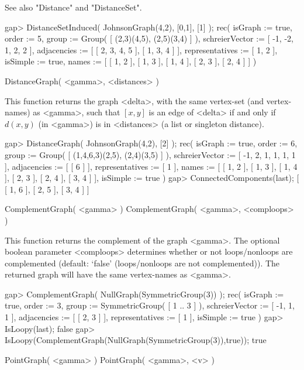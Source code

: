 See also "Distance" and "DistanceSet". 

\beginexample
gap> DistanceSetInduced( JohnsonGraph(4,2), [0,1], [1] );
rec(
  isGraph := true,
  order := 5,
  group := Group( [ (2,3)(4,5), (2,5)(3,4) ] ),
  schreierVector := [ -1, -2, 1, 2, 2 ],
  adjacencies := [ [ 2, 3, 4, 5 ], [ 1, 3, 4 ] ],
  representatives := [ 1, 2 ],
  isSimple := true,
  names := [ [ 1, 2 ], [ 1, 3 ], [ 1, 4 ], [ 2, 3 ], [ 2, 4 ] ] )
\endexample


\>DistanceGraph( <gamma>, <distances> )

This function returns the graph <delta>, with the same vertex-set
(and vertex-names) as <gamma>, such that $[x,y]$ is an edge of <delta>
if and only if $d(x,y)$ (in <gamma>) is in <distances> (a list or
singleton distance).

\beginexample
gap> DistanceGraph( JohnsonGraph(4,2), [2] );
rec(
  isGraph := true,
  order := 6,
  group := Group( [ (1,4,6,3)(2,5), (2,4)(3,5) ] ),
  schreierVector := [ -1, 2, 1, 1, 1, 1 ],
  adjacencies := [ [ 6 ] ],
  representatives := [ 1 ],
  names := [ [ 1, 2 ], [ 1, 3 ], [ 1, 4 ], [ 2, 3 ], [ 2, 4 ], [ 3, 4 ] ],
  isSimple := true )
gap> ConnectedComponents(last);
[ [ 1, 6 ], [ 2, 5 ], [ 3, 4 ] ]
\endexample


\>ComplementGraph( <gamma> )
\>ComplementGraph( <gamma>, <comploops> )

This function returns the complement of the graph <gamma>. The optional
boolean parameter <comploops> determines whether or not loops/nonloops are
complemented (default: `false' (loops/nonloops are not complemented)). The
returned graph will have the same vertex-names as <gamma>.

\beginexample
gap> ComplementGraph( NullGraph(SymmetricGroup(3)) );
rec(
  isGraph := true,
  order := 3,
  group := SymmetricGroup( [ 1 .. 3 ] ),
  schreierVector := [ -1, 1, 1 ],
  adjacencies := [ [ 2, 3 ] ],
  representatives := [ 1 ],
  isSimple := true )
gap> IsLoopy(last);
false
gap> IsLoopy(ComplementGraph(NullGraph(SymmetricGroup(3)),true));
true
\endexample


\>PointGraph( <gamma> )
\>PointGraph( <gamma>, <v> )

